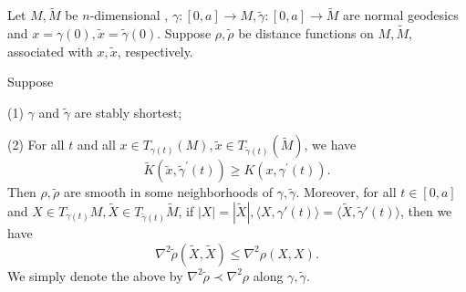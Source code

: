 \documentclass{ctexart}
\begin{document}
Let $M, \widetilde{M}$ be $n$-dimensional , $\gamma:[0, a] \rightarrow M, \widetilde{\gamma}:[0, a] \rightarrow \widetilde{M}$ are normal geodesics and $x=\gamma(0), \widetilde{x}=\widetilde{\gamma}(0)$. 
Suppose $\rho, \widetilde{\rho}$ be distance functions on $M, \widetilde{M}$, associated with $x, \widetilde{x}$, respectively. 
\begin{theorem}
  Suppose 

  (1) $\gamma$ and $\widetilde{\gamma}$ are stably shortest; 

  (2) For all $t$ and all $x \in T_{\gamma(t)}(M), \tilde{x} \in T_{\tilde{\gamma}(t)}(\tilde{M})$, we have
  $$
  \tilde{K}\left(\tilde{x}, \tilde{\gamma}^{\prime}(t)\right) \geq K\left(x, \gamma^{\prime}(t)\right). 
  $$
  Then $\rho, \widetilde{\rho}$ are smooth in some neighborhoods of $\gamma, \widetilde{\gamma}$. Moreover, for all $t \in[0, a]$ and $X \in T_{\gamma(t)} M, \tilde{X} \in T_{\widetilde{\gamma}(t)} \widetilde{M}$, 
  if $|X|=|\widetilde{X}|,\langle X, \gamma'(t)\rangle=\langle\widetilde{X}, \widetilde{\gamma}'(t)\rangle$, then we have 
  $$
  \nabla^2 \widetilde{\rho}(\widetilde{X}, \widetilde{X}) \leq \nabla^2 \rho(X, X).
  $$
  We simply denote the above by $\nabla^2 \widetilde{\rho} \prec \nabla^2 \rho$ along $\gamma, \widetilde{\gamma}$.  
\end{theorem}
\end{document}
